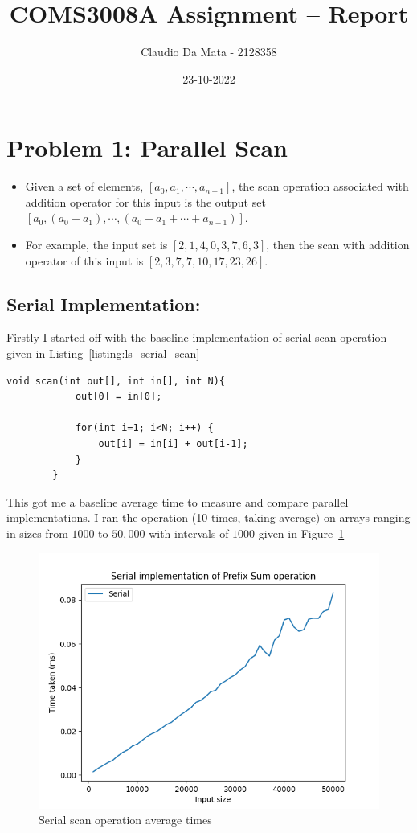 

	\title{COMS3008A Assignment -- Report}
	\author{Claudio Da Mata - 2128358}
	\date{23-10-2022} 
	\maketitle 
	\pagestyle{fancy}
	\fancyhf{}
	\fancyhead[R]{\thepage}
	\graphicspath{ {./pics/} }
	
	
	\section{Problem 1: Parallel Scan}
	\begin{itemize}
		\item  Given a set of elements, $[a_0,a_1,\dotsm,a_{n-1}]$, the scan operation associated with addition operator for this input is the output set $[a_0,(a_0+a_1),\dotsm,(a_0+a_1+\dotsm+a_{n-1})]$. 
		\item For example, the input set is $[2,1,4,0,3,7,6,3]$, then the scan with addition operator of this input is $[2,3,7,7,10,17,23,26]$. 
	\end{itemize}

	\subsection{Serial Implementation:}
	Firstly I started off with the baseline implementation of serial scan operation given in Listing~\ref{listing:ls_serial_scan}
	\begin{lstlisting}[caption={Sequential algorithm for computing scan operation with ‘+’ operator\cite{PrefixSumArray}.}, label={listing:ls_serial_scan}]
		void scan(int out[], int in[], int N){
			out[0] = in[0];
			
			for(int i=1; i<N; i++) {
				out[i] = in[i] + out[i-1];
			}
		}
	\end{lstlisting}
	
	This got me a baseline average time to measure and compare parallel implementations. I ran the operation (10 times, taking average) on arrays ranging in sizes from $1000$ to $50,000$ with intervals of $1000$ given in Figure~\ref{fig:fig_serial_scan}
	\begin{figure}[!htb]
		\centering
		\includegraphics[width=0.6\linewidth]{serial_scan.png}
		\caption{Serial scan operation average times}
		\label{fig:fig_serial_scan}
	\end{figure}
	
